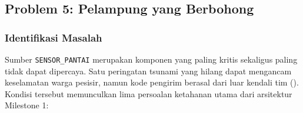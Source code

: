 \subsection{Problem 5: Pelampung yang Berbohong}

\subsubsection{Identifikasi Masalah}

Sumber \texttt{SENSOR\_PANTAI} merupakan komponen yang paling kritis sekaligus paling tidak dapat dipercaya. Satu peringatan tsunami yang hilang dapat mengancam keselamatan warga pesisir, namun kode pengirim berasal dari luar kendali tim (). Kondisi tersebut memunculkan lima persoalan ketahanan utama dari arsitektur Milestone 1:

